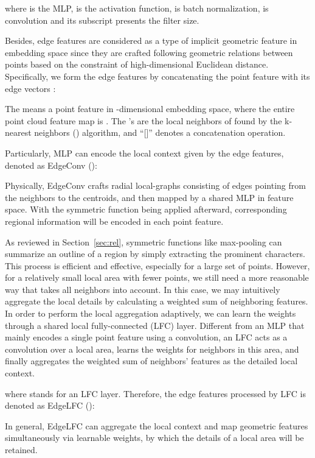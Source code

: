 \documentclass[journal,twoside]{IEEEtran}
\begin{document}
where  is the MLP,  is the activation function,  is batch normalization,  is convolution and its subscript presents the filter size.

Besides, edge features  are considered as a type of implicit geometric feature in embedding space since they are crafted following geometric relations between points based on the constraint of high-dimensional Euclidean distance. Specifically, we form the edge features by concatenating the point feature  with its edge vectors :

The  means a point feature in -dimensional embedding space, where the entire point cloud feature map is . The 's are the local neighbors of  found by the k-nearest neighbors () algorithm, and \enquote{[\;\;]} denotes a concatenation operation.

Particularly, MLP can encode the local context given by the edge features, denoted as EdgeConv ():

Physically, EdgeConv crafts radial local-graphs consisting of edges pointing from the neighbors to the centroids, and then mapped by a shared MLP in feature space. With the symmetric function being applied afterward, corresponding regional information will be encoded in each point feature.

As reviewed in Section~\ref{sec:rel}, symmetric functions like max-pooling can summarize an outline of a region by simply extracting the prominent characters. This process is efficient and effective, especially for a large set of points. However, for a relatively small local area with fewer points, we still need a more reasonable way that takes all neighbors into account. In this case, we may intuitively aggregate the local details by calculating a weighted sum of neighboring features. In order to perform the local aggregation adaptively, we can learn the weights through a shared local fully-connected (LFC) layer. Different from an MLP that mainly encodes a single point feature using a  convolution, an LFC acts as a  convolution over a local area, learns the weights for  neighbors in this area, and finally aggregates the weighted sum of  neighbors' features as the detailed local context.

where  stands for an LFC layer. Therefore, the edge features processed by LFC is denoted as EdgeLFC ():


In general, EdgeLFC can aggregate the local context and map geometric features simultaneously via learnable weights, by which the details of a local area will be retained.
\end{document}

